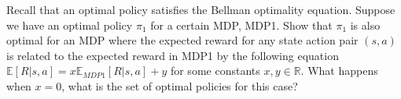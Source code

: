 Recall that an optimal policy satisfies the Bellman optimality equation.
Suppose we have an optimal policy $\pi_1$ for a certain MDP, MDP1.
Show that $\pi_1$ is also optimal for an MDP where
the expected reward for any state action pair $(s,a)$ is related
to the expected reward in MDP1 by the following equation
$\mathbb{E}[R|s,a] =x\mathbb{E}_{MDP 1}[R|s,a]+y$ for some
constants $x , y \in \mathbb{R}$.
What happens when $x=0$, what is the set of optimal policies for this case?
\smallspace
